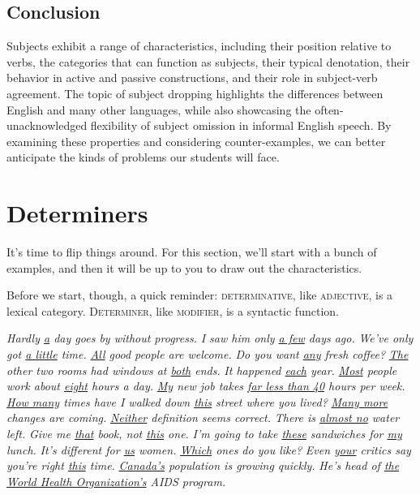 \subsection{Conclusion}
Subjects exhibit a range of characteristics, including their position relative to verbs, the categories that can function as subjects, their typical denotation, their behavior in active and passive constructions, and their role in subject-verb agreement. The topic of subject dropping highlights the differences between English and many other languages, while also showcasing the often-unacknowledged flexibility of subject omission in informal English speech. By examining these properties and considering counter-examples, we can better anticipate the kinds of problems our students will face.

\section{Determiners}
It's time to flip things around. For this section, we'll start with a bunch of examples, and then it will be up to you to draw out the characteristics.

Before we start, though, a quick reminder: \textsc{determinative}, like \textsc{adjective}, is a lexical category. \textsc{Determiner}, like \textsc{modifier}, is a syntactic function.

\ea \label{ex:determiners}
    \ea\textit{Hardly \uline{a} day goes by without progress.}
    \ex\textit{I saw him only \uline{a few} days ago.}
    \ex\textit{We've only got \uline{a little} time.} 
    \ex\textit{\uline{All} good people are welcome.} 
    \ex\textit{Do you want \uline{any} fresh coffee?} 
    \ex\textit{\uline{The} other two rooms had windows at \uline{both} ends.} 
    \ex\textit{It happened \uline{each} year.} 
    \ex\textit{\uline{Most} people work about \uline{eight} hours a day.} 
    \ex\textit{\uline{My} new job takes \uline{far less than 40} hours per week.} 
    \ex\textit{\uline{How many} times have I walked down \uline{this} street where you lived?} 
    \ex\textit{\uline{Many more} changes are coming.} 
    \ex\textit{\uline{Neither} definition seems correct.} 
    \ex\textit{There is \uline{almost no} water left.} 
    \ex\textit{Give me \uline{that} book, not \uline{this} one.} 
    \ex\textit{I'm going to take \uline{these} sandwiches for \uline{my} lunch.} 
    \ex\textit{It's different for \uline{us} women.} 
    \ex\textit{\uline{Which} ones do you like?} 
    \ex\textit{Even \uline{your} critics say you're right \uline{this} time.}
    \ex\textit{\uline{Canada's} population is growing quickly.} 
    \ex\textit{He's head of \uline{the World Health Organization's} AIDS program.}
    \z
\z

